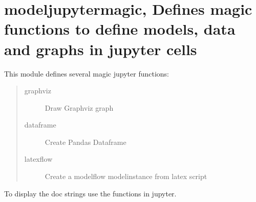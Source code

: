 \documentclass[letterpaper,10pt,english]{sphinxmanual}
\begin{document}
\section{modeljupytermagic, Defines magic functions to define models, data and graphs in jupyter cells}
\label{\detokenize{index:module-modeljupytermagic}}\label{\detokenize{index:modeljupytermagic-defines-magic-functions-to-define-models-data-and-graphs-in-jupyter-cells}}
\sphinxAtStartPar
This module defines several magic jupyter functions:
\begin{quote}\begin{description}
\item[{graphviz}] \leavevmode
\sphinxAtStartPar
Draw Graphviz graph

\item[{dataframe}] \leavevmode
\sphinxAtStartPar
Create Pandas Dataframe

\item[{latexflow}] \leavevmode
\sphinxAtStartPar
Create a modelflow modelinstance from latex script

\end{description}\end{quote}

\sphinxAtStartPar
To display the doc strings use the functions in jupyter.
\end{document}

